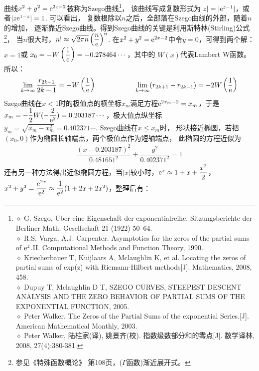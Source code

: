 \begin{enumerate}[label={【\textbf{例\thechapter.\arabic*}】},
 leftmargin=\inteval{\myenumleftmargin}pt,
 itemsep=\inteval{\myenumitempsep}pt,
 itemindent=\inteval{\myenumitemindent}pt]
曲线$ x^2+y^2=\mathrm{e}^{2x-2} $被称为Szego曲线\footnote{
    $ \diamond $  G. Szego, Uber eine Eigenschaft der exponentialreihe, Sitzungsberichte der Berliner Math. Gesellschaft 21 (1922) 50–64. \\
    $ \diamond $ R.S. Varga, A.J. Carpenter. Asymptotics for the zeros of the partial sums of $ \mathrm{e}^z $.II. Computational Methods and Function Theory, 1990. \\
    $ \diamond $ Kriecherbauer T,  Kuijlaars A,  Mclaughlin K, et al. Locating the zeros of partial sums of exp(z) with Riemann-Hilbert methods[J]. Mathematics, 2008, 458. \\
    $ \diamond $ Dupuy T,  Mclaughlin D T, SZEGO CURVES, STEEPEST DESCENT ANALYSIS AND THE ZERO BEHAVIOR OF PARTIAL SUMS OF THE EXPONENTIAL FUNCTION, 2005.  \\
    $ \diamond $ Peter Walker. The Zeros of the Partial Sums of the exponential Series.[J]. American Mathematical Monthly, 2003.  \\
    $ \diamond $ Peter Walker, 陆柱家(译), 姚景齐(校). 指数级数部分和的零点[J]. 数学译林, 2008, 27(4):380-381.}，
该曲线写成复数形式为$ |z|=|\mathrm{e}^{z-1}| $，或者$ |z\mathrm{e}^{1-z}|=1 $. 可以看出，
复数根除以$ n $之后，全部落在Szego曲线的外部，随着$ n $的增加，
逐渐靠近Szego曲线。得到Szego曲线的关键是利用斯特林(Stirling)公式
\footnote{参见《特殊函数概论》 第108页，($ \Gamma $函数)渐近展开式。}，
当$ n $很大时，$ n!\approx \sqrt{2\pi n}\left(\dfrac{n}{\mathrm{e}}\right)^n $. 
在$ x^2+y^2=\mathrm{e}^{2x-2}$中令$ y=0 $，可得到两个解：$ x=1 $或
$ x_0=-W\left(\dfrac{1}{\mathrm{e}}\right)=-0.278464\cdots $，其中的
$ W(x) $代表Lambert W函数。所以：
\begin{align*}
    \lim_{k\to \infty}\dfrac{r_{2k-1}}{2k-1}=-W\left(\dfrac{1}{\mathrm{e}}\right)
    \hspace{2cm}  \lim_{k\to \infty}(r_{2k+1}-r_{2k-1})
    =-2W\left(\dfrac{1}{\mathrm{e}}\right)
\end{align*}
Szego曲线在$ x<1 $时的极值点的横坐标$ x_m $满足方程$ \mathrm{e}^{2x_m-2}=x_m $，于是
$ x_m=-\dfrac{1}{2}W(-\dfrac{2}{\mathrm{e}^2})=0.203187\cdots $，极大值点纵坐标
$ y_m=\sqrt{x_m-x_m^2}=0.402371\cdots $. Szego曲线在$ x\leq x_m $时，
形状接近椭圆，若把$ (x_0,0) $作为椭圆长轴端点，两个极值点作为短轴端点，
此椭圆的方程近似为
\begin{align*}
    \dfrac{(x-0.203187)^2}{0.481651^2}+\dfrac{y^2}{0.402371^2}=1
\end{align*}
还有另一种方法得出近似椭圆方程，当$ |x| $较小时，$ \mathrm{e}^x\approx 1+x+
\dfrac{x^2}{2} $，
$ x^2+y^2=\dfrac{\mathrm{e}^{2x}}{\mathrm{e}^2}\approx\dfrac{1}{\mathrm{e}^2}(1+2x+2x^2) $，整理后有：
\begin{gather*}

\end{gather*}
\end{enumerate}
